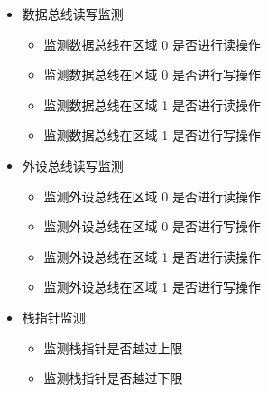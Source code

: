 \documentclass[main\_\_CN.tex]{subfiles}
\begin{document}
\begin{itemize}
    \item 数据总线读写监测
        \begin{itemize}
            \item 监测数据总线在区域 0 是否进行读操作
            \item 监测数据总线在区域 0 是否进行写操作
            \item 监测数据总线在区域 1 是否进行读操作
            \item 监测数据总线在区域 1 是否进行写操作
        \end{itemize}    
    \item 外设总线读写监测
        \begin{itemize}
            \item 监测外设总线在区域 0 是否进行读操作
            \item 监测外设总线在区域 0 是否进行写操作
            \item 监测外设总线在区域 1 是否进行读操作
            \item 监测外设总线在区域 1 是否进行写操作
        \end{itemize}
    \item 栈指针监测
        \begin{itemize}
            \item 监测栈指针是否越过上限
            \item 监测栈指针是否越过下限
        \end{itemize}
\end{itemize}
\end{document}
